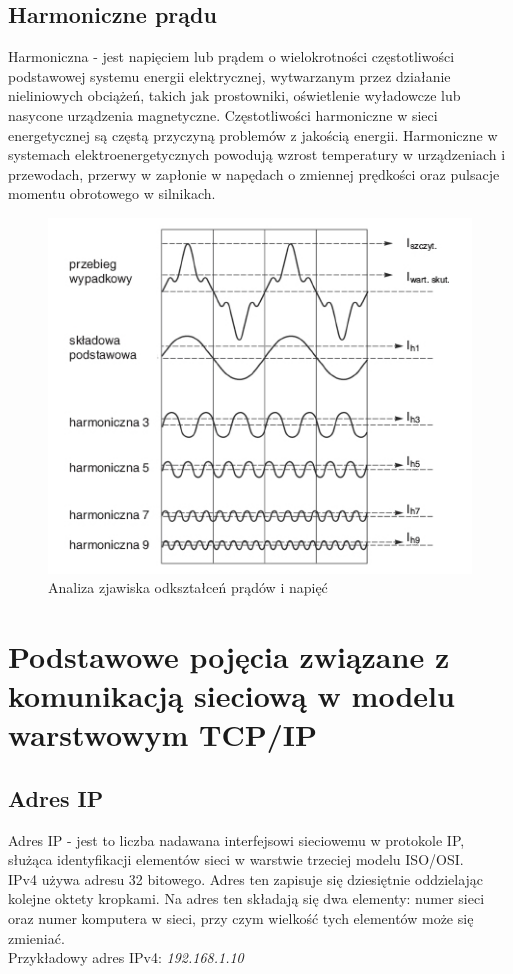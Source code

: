 \documentclass[12pt]{article}
\begin{document}
\subsection{Harmoniczne prądu}
 Harmoniczna - jest napięciem lub prądem o wielokrotności częstotliwości podstawowej systemu energii elektrycznej, wytwarzanym przez działanie nieliniowych obciążeń, takich jak prostowniki, oświetlenie wyładowcze lub nasycone urządzenia magnetyczne. Częstotliwości harmoniczne w sieci energetycznej są częstą przyczyną problemów z jakością energii. Harmoniczne w systemach elektroenergetycznych powodują wzrost temperatury w urządzeniach i przewodach, przerwy w zapłonie w napędach o zmiennej prędkości oraz pulsacje momentu obrotowego w silnikach.
 \begin{figure}[H]
    \centering
    \includegraphics[scale=0.5]{harmonics}
    \caption{Analiza zjawiska odkształceń prądów i napięć}
    \label{fig:my_label}
\end{figure}
\section{Podstawowe pojęcia związane z komunikacją sieciową w modelu warstwowym TCP/IP}
\subsection{Adres IP}
Adres IP - jest to liczba nadawana interfejsowi sieciowemu w protokole IP, służąca identyfikacji elementów sieci w warstwie trzeciej modelu ISO/OSI.\\
IPv4 używa adresu 32 bitowego. Adres ten zapisuje się dziesiętnie oddzielając kolejne oktety kropkami. Na adres ten składają się dwa elementy: numer sieci oraz numer komputera w sieci, przy czym wielkość tych elementów może się zmieniać.\\
Przykładowy adres IPv4: \textit{192.168.1.10}
\end{document}

